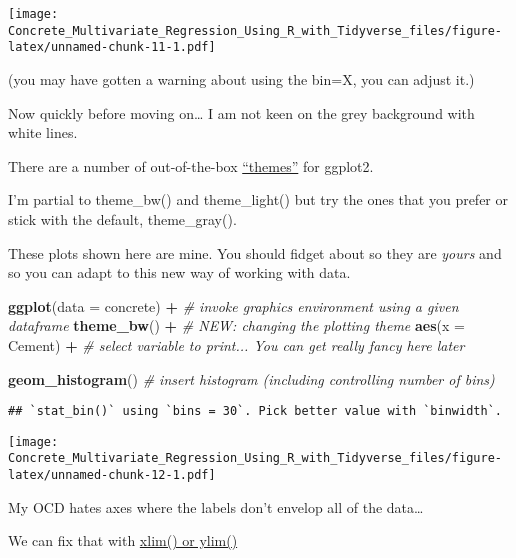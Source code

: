 \documentclass[]{article}
\newenvironment{Shaded}{\begin{snugshade}}{\end{snugshade}}
\newcommand{\CommentTok}[1]{\textcolor[rgb]{0.56,0.35,0.01}{\textit{#1}}}
\newcommand{\DataTypeTok}[1]{\textcolor[rgb]{0.13,0.29,0.53}{#1}}
\newcommand{\KeywordTok}[1]{\textcolor[rgb]{0.13,0.29,0.53}{\textbf{#1}}}
\newcommand{\NormalTok}[1]{#1}
\newcommand{\OperatorTok}[1]{\textcolor[rgb]{0.81,0.36,0.00}{\textbf{#1}}}
\newcommand{\StringTok}[1]{\textcolor[rgb]{0.31,0.60,0.02}{#1}}
\begin{document}
\texttt{[image: Concrete\_Multivariate\_Regression\_Using\_R\_with\_Tidyverse\_files/figure-latex/unnamed-chunk-11-1.pdf]}

(you may have gotten a warning about using the bin=X, you can adjust
it.)

Now quickly before moving on\ldots{} I am not keen on the grey
background with white lines.

There are a number of out-of-the-box
\href{https://ggplot2.tidyverse.org/reference/ggtheme.html}{``themes''}
for ggplot2.

I'm partial to theme\_bw() and theme\_light() but try the ones that you
prefer or stick with the default, theme\_gray().

These plots shown here are mine. You should fidget about so they are
\emph{yours} and so you can adapt to this new way of working with data.

\begin{Shaded}
\begin{Highlighting}[]
\KeywordTok{ggplot}\NormalTok{(}\DataTypeTok{data =}\NormalTok{ concrete) }\OperatorTok{+}\StringTok{ }\CommentTok{# invoke graphics environment using a given dataframe}
\StringTok{  }
\StringTok{  }\KeywordTok{theme_bw}\NormalTok{() }\OperatorTok{+}\StringTok{            }\CommentTok{# NEW: changing the plotting theme}
\StringTok{  }
\StringTok{  }\KeywordTok{aes}\NormalTok{(}\DataTypeTok{x =}\NormalTok{ Cement) }\OperatorTok{+}\StringTok{       }\CommentTok{# select variable to print... You can get really fancy here later}

\StringTok{  }\KeywordTok{geom_histogram}\NormalTok{()        }\CommentTok{# insert histogram (including controlling number of bins)}
\end{Highlighting}
\end{Shaded}

\begin{verbatim}
## `stat_bin()` using `bins = 30`. Pick better value with `binwidth`.
\end{verbatim}

\texttt{[image: Concrete\_Multivariate\_Regression\_Using\_R\_with\_Tidyverse\_files/figure-latex/unnamed-chunk-12-1.pdf]}

My OCD hates axes where the labels don't envelop all of the data\ldots{}

We can fix that with
\href{https://ggplot2.tidyverse.org/reference/lims.html}{xlim() or
ylim()}
\end{document}
